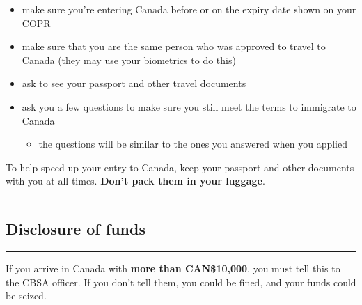 \documentclass[
]{article}
\providecommand{\tightlist}{%
  \setlength{\itemsep}{0pt}\setlength{\parskip}{0pt}}
\begin{document}
\begin{itemize}
\item
  make sure you're entering Canada before or on the expiry date shown on
  your COPR
\item
  make sure that you are the same person who was approved to travel to
  Canada (they may use your biometrics to do this)
\item
  ask to see your passport and other travel documents
\item
  ask you a few questions to make sure you still meet the terms to
  immigrate to Canada

  \begin{itemize}
  \tightlist
  \item
    the questions will be similar to the ones you answered when you
    applied
  \end{itemize}
\end{itemize}

To help speed up your entry to Canada, keep your passport and other
documents with you at all times. \textbf{Don't pack them in your
luggage}.

\begin{center}\rule{0.5\linewidth}{0.5pt}\end{center}

\hypertarget{disclosure-of-funds}{%
\subsection{Disclosure of funds}\label{disclosure-of-funds}}

\begin{center}\rule{0.5\linewidth}{0.5pt}\end{center}

If you arrive in Canada with \textbf{more than CAN\$10,000}, you must
tell this to the CBSA officer. If you don't tell them, you could be
fined, and your funds could be seized.
\end{document}
